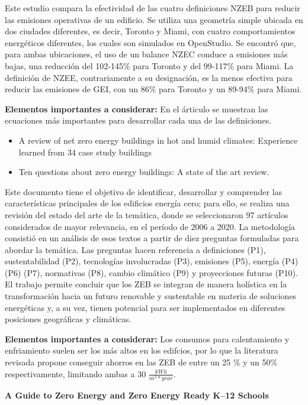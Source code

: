Este estudio compara la efectividad de las cuatro definiciones NZEB para reducir las emisiones operativas de un edificio. Se utiliza una geometría simple ubicada en dos ciudades diferentes, es decir, Toronto y Miami, con cuatro comportamientos energéticos diferentes, los cuales son simulados en OpenStudio. Se encontró que, para ambas ubicaciones, el uso de un balance NZEC conduce a emisiones más bajas, una reducción del 102-145$\%$ para Toronto y del 99-117$\%$ para Miami. La definición de NZEE, contrariamente a su designación, es la menos efectiva para reducir las emisiones de GEI, con un 86$\%$ para Toronto y un 89-94$\%$ para Miami.


\textbf{Elementos importantes a considerar:} En el árticulo se muestran las ecuaciones más importantes para desarrollar cada una de las definiciones.
\begin{itemize}
\item A review of net zero energy buildings in hot and humid climates: Experience learned from 34 case study buildings
\item Ten questions about zero energy buildings: A state of the art review.
\end{itemize}


Este documento tiene el objetivo de identificar, desarrollar y comprender las características principales de los edificios energía cero; para ello, se realiza una revisión del estado del arte de la temática, donde se seleccionaron 97 artículos considerados de mayor relevancia, en el período de 2006 a 2020. La metodología consistió en un análisis de esos textos a partir de diez preguntas formuladas para abordar la temática. Las preguntas hacen referencia a definiciones (P1), sustentabilidad (P2), tecnologías involucradas (P3), emisiones (P5), energía (P4) (P6) (P7), normativas (P8), cambio climático (P9) y proyecciones futuras (P10). El trabajo permite concluir que los ZEB se integran de manera holística en la transformación hacia un futuro renovable y sustentable en materia de soluciones energéticas y, a su vez, tienen potencial para ser implementados en diferentes posiciones geográficas y climáticas.


\textbf{Elementos importantes a considerar:} Los consumos para calentamiento y enfriamiento suelen ser los más altos en los edifcios, por lo que la literatura revisada propone conseguir ahorros en las ZEB de entre un 25 $\%$ y un 50$\%$ respectivamente, limitando ambas a 30 $\frac{kWh}{m^{2}*year}$.


 \textbf{A Guide to Zero Energy and Zero Energy Ready K–12 Schools}


